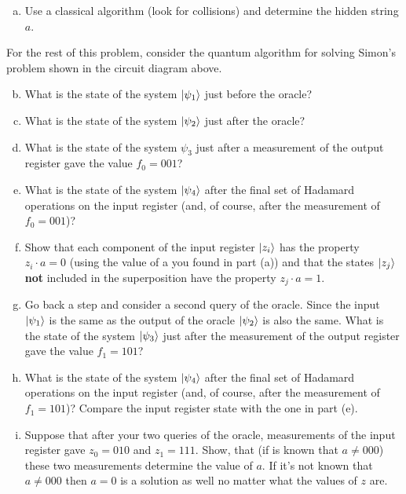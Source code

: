 \documentclass{book}
\theoremstyle{definition}
\begin{document}
\begin{enumerate}[(a)]
	\item Use a classical algorithm (look for collisions) and determine the hidden string $a$.
\end{enumerate}

For the rest of this problem, consider the quantum algorithm for solving Simon's problem shown in the circuit diagram above.


\begin{enumerate}[(a)]\setcounter{enumi}{1}
	\item What is the state of the system $\ket{\psi_1}$ just before the oracle?

	
	\item What is the state of the system $\ket{\psi_2}$ just after the oracle? 
	
	
	\item What is the state of the system $\psi_3$ just after a measurement of the output register gave the value $f_0 = 001$?

	
	
	\item  What is the state of the system $\ket{\psi_4}$ after the final set of Hadamard operations on the
	input register (and, of course, after the measurement of $f_0 = 001$)?
	
	
	\item Show that each component of the input register $\ket{z_i}$ has the property $z_i \cdot a = 0$ (using the value of a you found in part (a)) and that the states $\ket{z_j}$ \textbf{not} included in the superposition
	have the property $z_j \cdot a = 1$. 
	
	
	\item Go back a step and consider a second query of the oracle. Since the input $\ket{\psi_1}$ is the same as the output of the oracle $\ket{\psi_2}$ is also the same. What is the state of the system $\ket{\psi_3}$ just after the measurement  of the output register gave the value $f_1 = 101$? 
	
	
	
	\item What is the state of the system $\ket{\psi_4}$ after the final set of Hadamard operations on the input register (and, of course, after the measurement of $f_1 = 101$)? Compare the input register state with the one in part (e). 
	
	
	
	
	\item Suppose that after your two queries of the oracle, measurements of the input register
	gave $z_0 = 010$ and $z_1 = 111$. Show, that (if is known that $a\neq 000$) these two measurements determine the value of $a$. If it's not known that $a\neq 000$ then $a=0$ is a
	solution as well no matter what the values of $z$ are. 
\end{enumerate}
\end{document}
